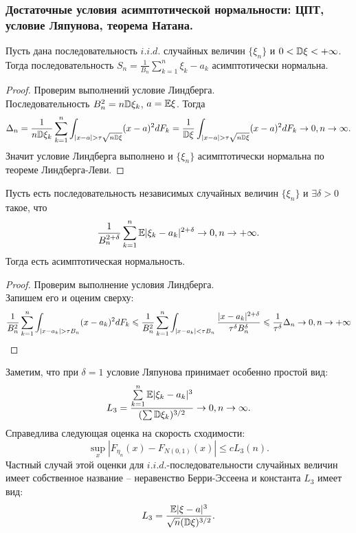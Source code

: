 \subsubsection{Достаточные условия асимптотической нормальности: ЦПТ, условие Ляпунова, теорема Натана.}
\begin{theorem}[ЦПТ]
    Пусть дана последовательность $i.i.d.$ случайных величин $\{\xi_n\}$ и $0 < \mathbb{D} \xi < +\infty$.
    Тогда последовательность $S_n = \frac{1}{B_n}\sum\limits_{k = 1}^n \xi_k - a_k$ асимптотически нормальна.
\end{theorem}
\begin{proof}
    Проверим выполнений условие Линдберга. \\
    Последовательность $B_n^2 = n \mathbb{D} \xi_k$, $a = \mathbb{E} \xi$.
    Тогда
    \[
        \Delta_n  =\dfrac{1}{n \mathbb{D} \xi_k} \sum\limits_{k = 1}^{n} \int_{|x - a| > \tau \sqrt {n \mathbb{D} \xi}} (x - a)^2 dF_k = \dfrac{1}{\mathbb{D} \xi} \int_{|x - a| > \tau \sqrt {n \mathbb{D} \xi}} (x - a)^2 dF_k \rightarrow 0, n \rightarrow \infty.
    \]
    Значит условие Линдберга выполнено и $\{\xi_n\}$ асимптотически нормальна по теореме Линдберга-Леви.
\end{proof}
\begin{theorem}
    Пусть есть последовательность независимых случайных величин $\{\xi_n\}$ и $\exists \delta > 0$ такое, что 
    \[
        \dfrac{1}{B_n^{2 + \delta}}\sum\limits_{k = 1}^{n} \mathbb{E}|\xi_k - a_k|^{2 + \delta} \rightarrow 0, n \rightarrow +\infty.
    \]
    Тогда есть асимптотическая нормальность.
\end{theorem}
\begin{proof}
    Проверим выполнение условия Линдберга. \\
    Запишем его и оценим сверху:
    \[
        \dfrac{1}{B_n^2}\sum\limits_{k = 1}^{n} \int_{|x - a_k| > \tau B_n} (x - a_k)^{2}dF_k \leqslant \dfrac{1}{B_n^2}\sum\limits_{k = 1}^{n} \int_{|x - a_k| < \tau B_n} \dfrac{|x - a_k|^{2 + \delta}}{\tau^\delta B_n^{\delta}} \leqslant \dfrac{1}{\tau^\delta} \Delta_n \rightarrow 0, n \rightarrow  +\infty
    \]
\end{proof}
\begin{note}
    Заметим, что при $\delta = 1$ условие Ляпунова принимает особенно простой вид:
    \[
        L_3 = \dfrac{\sum\limits_{k = 1}^{n} \mathbb{E} |\xi_k - a_k|^3}{(\sum \mathbb{D} \xi_k)^{3/2}} \rightarrow 0, n \rightarrow \infty.
    \]
    Справедлива следующая оценка на скорость сходимости:
    \[
        \sup\limits_{x} |F_{\eta_n}(x) - F_{N(0, 1)}(x)| \leq cL_3(n).
    \]
    Частный случай этой оценки для $i.i.d.$-последовательности случайных величин имеет собственное название -- неравенство Берри-Эссеена и константа $L_3$ имеет вид:
    \[
        L_3 = \dfrac{\mathbb{E} |\xi - a|^3}{\sqrt {n} (\mathbb{D} \xi)^{3/2}}.
    \]
\end{note}
